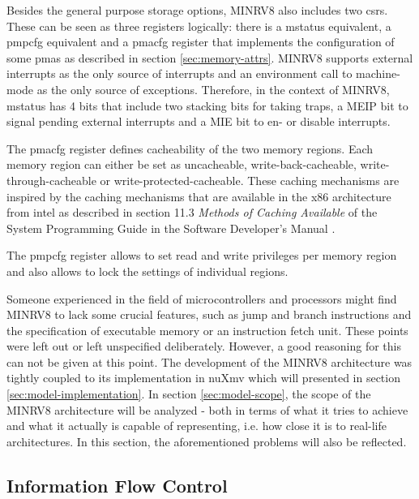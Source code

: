 Besides the general purpose storage options, MINRV8 also includes two \glspl{csr}.
These can be seen as three registers logically: there is a \gls{mstatus} equivalent, a \gls{pmpcfg} equivalent and a \gls{pmacfg} register that implements the configuration of some \glspl{pma} as described in section \ref{sec:memory-attrs}.
MINRV8 supports external interrupts as the only source of interrupts and an environment call to machine-mode as the only source of exceptions.
Therefore, in the context of MINRV8, \gls{mstatus} has 4 bits that include two stacking bits for taking traps, a MEIP bit to signal pending external interrupts and a MIE bit to en- or disable interrupts.

The \gls{pmacfg} register defines cacheability of the two memory regions.
Each memory region can either be set as uncacheable, write-back-cacheable, write-through-cacheable or write-protected-cacheable.
These caching mechanisms are inspired by the caching mechanisms that are available in the x86 architecture from intel as described in section 11.3 \textit{Methods of Caching Available} of the System Programming Guide in the Software Developer's Manual \cite{IntelSystemProgramming}.

The \gls{pmpcfg} register allows to set read and write privileges per memory region and also allows to lock the settings of individual regions.

Someone experienced in the field of microcontrollers and processors might find MINRV8 to lack some crucial features, such as jump and branch instructions and the specification of executable memory or an instruction fetch unit.
These points were left out or left unspecified deliberately.
However, a good reasoning for this can not be given at this point.
The development of the MINRV8 architecture was tightly coupled to its implementation in nuXmv which will presented in section \ref{sec:model-implementation}.
In section \ref{sec:model-scope}, the scope of the MINRV8 architecture will be analyzed - both in terms of what it tries to achieve and what it actually is capable of representing, i.e. how close it is to real-life architectures.
In this section, the aforementioned problems will also be reflected.

\subsection{Information Flow Control}

